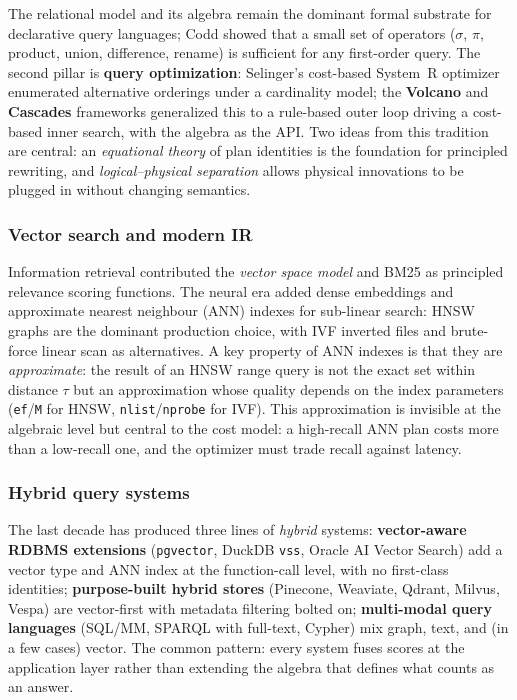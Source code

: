 \documentclass[acmsmall,review,anonymous]{acmart}
\theoremstyle{plain}
\theoremstyle{definition}
\theoremstyle{remark}
\begin{document}
The relational model \cite{codd1970} and its algebra remain the
dominant formal substrate for declarative query languages; Codd
showed that a small set of operators ($\sigma$, $\pi$, product,
union, difference, rename) is sufficient for any first-order query.
The second pillar is \textbf{query optimization}: Selinger's
cost-based System~R optimizer \cite{selinger1979} enumerated
alternative orderings under a cardinality model; the \textbf{Volcano}
\cite{graefe1994} and \textbf{Cascades} \cite{graefe1995} frameworks
generalized this to a rule-based outer loop driving a cost-based
inner search, with the algebra as the API. Two ideas from this
tradition are central: an \emph{equational theory} of plan identities
is the foundation for principled rewriting, and
\emph{logical--physical separation} allows physical innovations to be
plugged in without changing semantics.

\subsubsection*{Vector search and modern IR}

Information retrieval contributed the \emph{vector space model}
\cite{salton1975} and BM25 \cite{robertson1995} as principled
relevance scoring functions. The neural era added dense embeddings
\cite{mikolov2013,reimers2019} and approximate nearest neighbour
(ANN) indexes for sub-linear search: HNSW graphs \cite{malkov2018}
are the dominant production choice, with IVF inverted files and
brute-force linear scan as alternatives. A key property of ANN
indexes is that they are \emph{approximate}: the result of an HNSW
range query is not the exact set within distance $\tau$ but an
approximation whose quality depends on the index parameters
(\texttt{ef}/\texttt{M} for HNSW, \texttt{nlist}/\texttt{nprobe} for
IVF). This approximation is invisible at the algebraic level but
central to the cost model: a high-recall ANN plan costs more than a
low-recall one, and the optimizer must trade recall against latency.

\subsubsection*{Hybrid query systems}

The last decade has produced three lines of \emph{hybrid} systems:
\textbf{vector-aware RDBMS extensions} (\texttt{pgvector}, DuckDB
\texttt{vss}, Oracle AI Vector Search) add a vector type and ANN
index at the function-call level, with no first-class identities;
\textbf{purpose-built hybrid stores} (Pinecone, Weaviate, Qdrant,
Milvus, Vespa) are vector-first with metadata filtering bolted on;
\textbf{multi-modal query languages} (SQL/MM, SPARQL with full-text,
Cypher) mix graph, text, and (in a few cases) vector. The common
pattern: every system fuses scores at the application layer rather
than extending the algebra that defines what counts as an answer.
\end{document}
